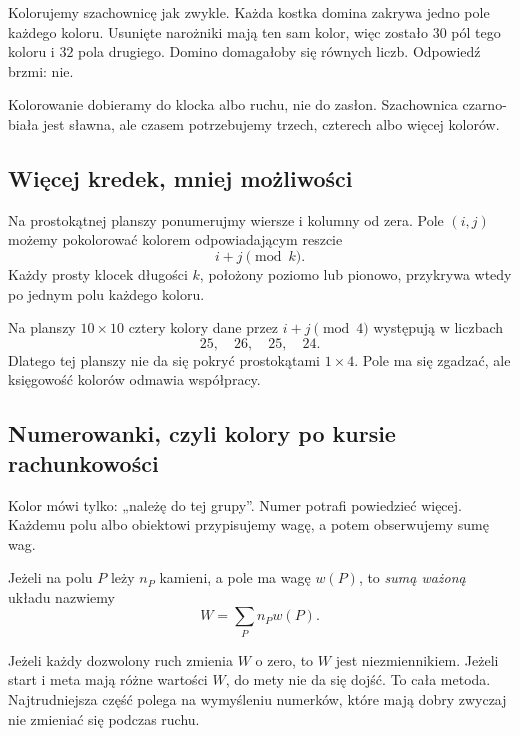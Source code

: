 \documentclass{lecture-kuznia}
\begin{document}
\begin{solution*}[\ref{Edomino}]
	Kolorujemy szachownicę jak zwykle. Każda kostka domina zakrywa jedno pole
	każdego koloru. Usunięte narożniki mają ten sam kolor, więc zostało
	$30$ pól tego koloru i $32$ pola drugiego. Domino domagałoby się równych
	liczb. Odpowiedź brzmi: nie.
\end{solution*}

\begin{remark}
	Kolorowanie dobieramy do klocka albo ruchu, nie do zasłon. Szachownica
	czarno-biała jest sławna, ale czasem potrzebujemy trzech, czterech albo
	więcej kolorów.
\end{remark}

\subsection{Więcej kredek, mniej możliwości}

Na prostokątnej planszy ponumerujmy wiersze i kolumny od zera. Pole $(i,j)$
możemy pokolorować kolorem odpowiadającym reszcie
	\[
		i+j\pmod k.
	\]
Każdy prosty klocek długości $k$, położony poziomo lub pionowo, przykrywa
wtedy po jednym polu każdego koloru.

Na planszy $10\times10$ cztery kolory dane przez $i+j\pmod4$ występują
w liczbach
	\[
		25,\quad 26,\quad 25,\quad 24.
	\]
Dlatego tej planszy nie da się pokryć prostokątami $1\times4$. Pole ma się
zgadzać, ale księgowość kolorów odmawia współpracy.

\subsection{Numerowanki, czyli kolory po kursie rachunkowości}

Kolor mówi tylko: „należę do tej grupy”. Numer potrafi powiedzieć więcej.
Każdemu polu albo obiektowi przypisujemy wagę, a potem obserwujemy sumę wag.

\begin{definition}
	Jeżeli na polu $P$ leży $n_P$ kamieni, a pole ma wagę $w(P)$, to
	\emph{sumą ważoną} układu nazwiemy
	\[
		W=\sum_P n_Pw(P).
	\]
\end{definition}

Jeżeli każdy dozwolony ruch zmienia $W$ o zero, to $W$ jest niezmiennikiem.
Jeżeli start i meta mają różne wartości $W$, do mety nie da się dojść. To
cała metoda. Najtrudniejsza część polega na wymyśleniu numerków, które mają
dobry zwyczaj nie zmieniać się podczas ruchu.
\end{document}
